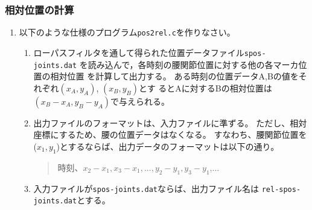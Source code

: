 \documentclass{jarticle}
\begin{document}
\subsubsection{相対位置の計算}
\begin{enumerate}
\item 以下のような仕様のプログラム\verb|pos2rel.c|を作りなさい。
  \begin{enumerate}
  \item ローパスフィルタを通して得られた位置データファイル\verb|spos-joints.dat|
    を読み込んで，各時刻の腰関節位置に対する他の各マーカ位置の相対位置
    を計算して出力する。
    ある時刻の位置データA,Bの値をそれぞれ$(x_A,y_A)$, $(x_B,y_B)$とす
    るとAに対するBの相対位置は$(x_B-x_A,y_B-y_A)$で与えられる。
  \item 
    出力ファイルのフォーマットは、入力ファイルに準ずる。
    ただし、相対座標にするため、腰の位置データはなくなる。
    すなわち、腰関節位置を($x_1,y_1$)とするならば、出力データのフォーマットは以下の通り。
\begin{quote}
時刻、$x_2-x_1, x_3-x_1,..., y_2-y_1, y_3-y_1$,...
\end{quote}
  \item 入力ファイルが\verb|spos-joints.dat|ならば、出力ファイル名は
    \verb|rel-spos-joints.dat|とする。
\end{enumerate}
\end{enumerate}
\end{document}
